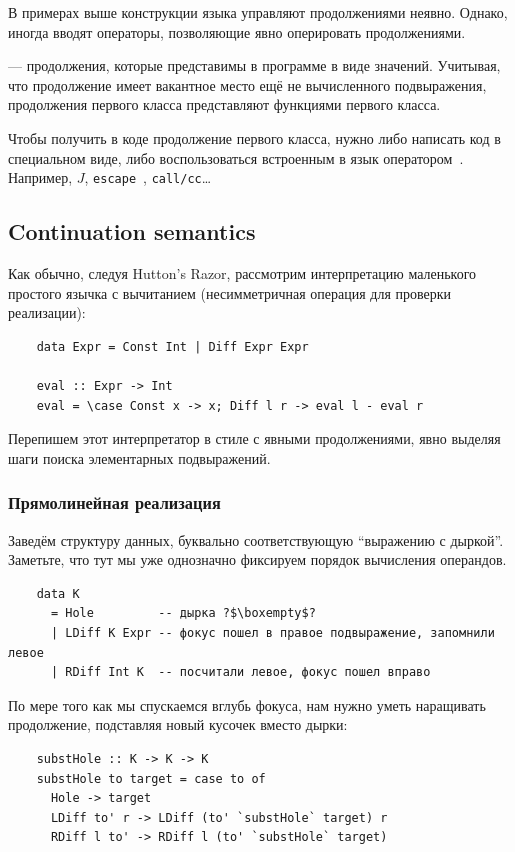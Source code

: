 В примерах выше конструкции языка управляют продолжениями неявно.
Однако, иногда вводят операторы, позволяющие явно оперировать продолжениями.

 --- продолжения, которые представимы в программе в виде значений.
Учитывая, что продолжение имеет вакантное место ещё не вычисленного подвыражения, продолжения первого класса представляют функциями первого класса.

Чтобы получить в коде продолжение первого класса, нужно либо написать код в специальном виде, либо воспользоваться встроенным в язык оператором~\cite[приложение A]{hillerstrom2022foundations}.
Например, $J$, \texttt{escape}~\cite{reynolds1972definitional}, \texttt{call/cc}\ldots %

\subsection{Continuation semantics} \label{subsec:definctionalized-cont}

Как обычно, следуя Hutton's Razor, рассмотрим интерпретацию маленького простого язычка с вычитанием (несимметричная операция для проверки реализации):
\begin{verbatim}
    data Expr = Const Int | Diff Expr Expr

    eval :: Expr -> Int
    eval = \case Const x -> x; Diff l r -> eval l - eval r
\end{verbatim}

Перепишем этот интерпретатор в стиле с явными продолжениями, явно выделяя шаги поиска элементарных подвыражений.

\subsubsection{Прямолинейная реализация}

Заведём структуру данных, буквально соответствующую ``выражению с дыркой''.
Заметьте, что тут мы уже однозначно фиксируем порядок вычисления операндов.
\begin{verbatim}
    data K
      = Hole         -- дырка ?$\boxempty$?
      | LDiff K Expr -- фокус пошел в правое подвыражение, запомнили левое
      | RDiff Int K  -- посчитали левое, фокус пошел вправо
\end{verbatim}

По мере того как мы спускаемся вглубь фокуса, нам нужно уметь наращивать продолжение, подставляя новый кусочек вместо дырки:
\begin{verbatim}
    substHole :: K -> K -> K
    substHole to target = case to of
      Hole -> target
      LDiff to' r -> LDiff (to' `substHole` target) r
      RDiff l to' -> RDiff l (to' `substHole` target)
\end{verbatim}

